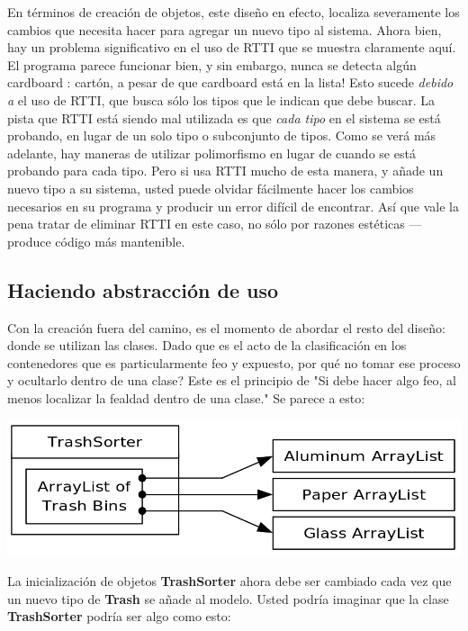 \documentclass{article}
\begin{document}
En términos de creación de objetos, este diseño en efecto, localiza severamente los cambios que necesita hacer para agregar un nuevo tipo al sistema. Ahora bien, hay un problema significativo en el uso de RTTI que se muestra claramente aquí. El programa parece funcionar bien, y sin embargo, nunca se detecta algún cardboard : cartón, a pesar de que cardboard está en la lista! Esto sucede \textit{debido a} el uso de RTTI, que busca sólo los tipos que le indican que debe buscar. La pista que RTTI está siendo mal utilizada es que \textit{cada tipo} en el sistema se está probando, en lugar de un solo tipo o subconjunto de tipos. Como se verá más adelante, hay maneras de utilizar polimorfismo en lugar de cuando se está probando para cada tipo. Pero si usa RTTI mucho de esta manera, y añade un nuevo tipo a su sistema, usted puede olvidar fácilmente  hacer los cambios necesarios en su programa y producir un error difícil de encontrar. Así que vale la pena tratar de eliminar RTTI en este caso, no sólo por razones estéticas — produce código más mantenible.      \newline

\subsection{Haciendo abstracción de uso}

Con la creación fuera del camino, es el momento de abordar el resto del diseño: donde se utilizan las clases. Dado que es el acto de la clasificación en los contenedores que es particularmente feo y expuesto, por qué no tomar ese proceso y ocultarlo dentro de una clase? Este es el principio de "Si debe hacer algo feo, al menos localizar la fealdad dentro de una clase." Se parece a esto:   \newline

\includegraphics[width=\textwidth]{Pag147SinTraducir.png}

La inicialización de objetos \textbf{TrashSorter} ahora debe ser cambiado cada vez que un nuevo tipo de \textbf{Trash} se añade al modelo. Usted podría imaginar que la clase \textbf{TrashSorter} podría ser algo como esto:     \newline
\end{document}

